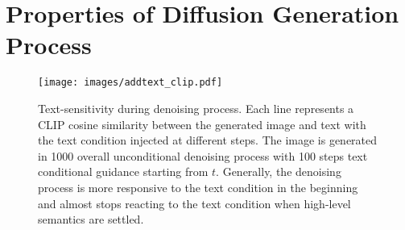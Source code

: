 \begin{table}[!htbp]
\setlength{\tabcolsep}{5pt}
\caption{Ablation study of the main improvements under the ATTRIBUTE EDITING setting: adaptive position (AP), dynamic attention modulation (DAM), and prompt intensification (PI) on the CelebA-TV2I validation set.}
\vspace{5mm} %
\centering
\setlength{\aboverulesep}{0pt} %
\setlength{\belowrulesep}{0pt} %
\vspace{-1mm} %
\label{tab:overall_ablation_analysis_editing}
\end{table}

\section*{Properties of Diffusion Generation Process} \label{sec:properties}
\begin{figure}[!h]
    \centering
    \texttt{[image: images/addtext\_clip.pdf]}
    \caption{Text-sensitivity during denoising process. Each line represents a CLIP cosine similarity between the generated image and text with the text condition injected at different steps. The image is generated in 1000 overall unconditional denoising process with 100 steps text conditional guidance starting from $t$. Generally, the denoising process is more responsive to the text condition in the beginning and almost stops reacting to the text condition when high-level semantics are settled.}
    \label{text_sensitivity}
\end{figure}
